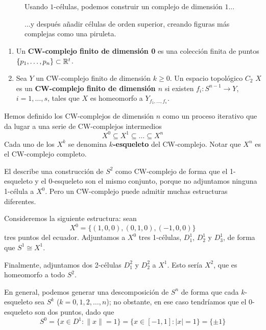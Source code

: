 \begin{marginfigure}
\centering
\begin{subfigure}[b]{\textwidth}

\caption{Usando $1$-células, podemos construir un complejo de dimensión
$1$...}
\end{subfigure}
\begin{subfigure}[b]{\textwidth}

\caption{...y después añadir células de orden superior, creando figuras más
complejas como una piruleta.}
\end{subfigure}
\end{marginfigure}

\begin{definition}
\begin{enumerate}
\item Un \textbf{CW-complejo finito de dimensión 0} es una colección finita de
puntos $\{p_1,\dots,p_n\} \subset \mathbb{R}^t$.
\item Sea $Y$ un CW-complejo finito de dimensión $k \geq 0$. Un espacio
topológico $C_2$ $X$ es un \textbf{CW-complejo finito de dimensión $n$} si
existen $f_i\colon S^{n-1} \longrightarrow Y$, $i=1,\dots,s$, tales que $X$ es
homeomorfo a $Y_{f_1,\dots,f_s}$.
\end{enumerate}
\end{definition}

Hemos definido los CW-complejos de dimensión $n$ como un proceso iterativo que
da lugar a una serie de CW-complejos intermedios
\[X^0 \subseteq X^1 \subseteq \dots \subseteq X^n\]
Cada uno de los $X^k$ se denomina \textbf{$k$-esqueleto} del CW-complejo. Notar
que $X^n$ es el CW-complejo completo.

\begin{example}
El  describe una construcción de $S^2$ como CW-complejo de
forma que el 1-esqueleto y el 0-esqueleto son el mismo conjunto, porque no
adjuntamos ninguna 1-célula a $X^0$. Pero un CW-complejo puede admitir muchas
estructuras diferentes. 

Consideremos la siguiente estructura: sean
\[X^0=\{(1,0,0), (0,1,0),(-1,0,0)\}\]
tres puntos del ecuador. Adjuntamos a $X^0$ tres 1-células, $D^1_1$, $D^1_2$
y $D^1_3$, de forma que $S^1\cong X^1$.

Finalmente, adjuntamos dos 2-células $D^2_1$ y $D^2_2$ a $X^1$. Esto sería
$X^2$, que es homeomorfo a todo $S^2$.

En general, podemos generar una descomposición de $S^n$ de forma que cada
$k$-esqueleto sea $S^k$ ($k=0,1,2,\dots,n$); no obstante, en ese caso
tendríamos que el 0-esqueleto son dos puntos, dado que
\[S^0=\{x \in D^1: \|x\|=1\}=\{x \in [-1,1]: |x|=1\}=\{\pm 1\}\]
\end{example}

